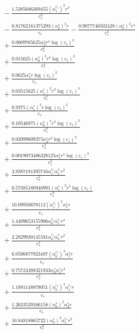 \documentclass[10pt]{article}
\begin{document}
\begin{align*}
&{}  - \frac{1.5385686369455 \left(\alpha_{1}^{c_s}\right)^{2} r^{3}}{c_{s}^{3}} \\
&{}  - \frac{0.81762161375293 \left(\alpha_{2}^s\right)^{2} r}{c_{s}} - \frac{0.9077746502428 \left(\alpha_{0}^s\right)^{3} r^{4}}{c_{s}^{4}} \\
&{}  + \frac{0.0009765625 \alpha_{2}^s r^{4} \log{\left(c_{s} \right)}^{3}}{c_{s}^{4}} \\
&{}  + \frac{0.015625 \left(\alpha_{0}^s\right)^{3} r^{4} \log{\left(c_{s} \right)}^{3}}{c_{s}^{4}} \\
&{}  + \frac{0.0625 \alpha_{5}^s r \log{\left(c_{s} \right)}^{2}}{c_{s}} \\
&{}  + \frac{0.03515625 \left(\alpha_{1}^s\right)^{2} r^{3} \log{\left(c_{s} \right)}^{3}}{c_{s}^{3}} \\
&{}  + \frac{0.9375 \left(\alpha_{1}^s\right)^{3} r \log{\left(c_{s} \right)}^{2}}{c_{s}} \\
&{}  + \frac{0.10546875 \left(\alpha_{0}^s\right)^{4} r^{3} \log{\left(c_{s} \right)}^{3}}{c_{s}^{3}} \\
&{}  + \frac{0.02099609375 \alpha_{3}^s r^{3} \log{\left(c_{s} \right)}^{2}}{c_{s}^{3}} \\
&{}  + \frac{0.0019073486328125 \alpha_{1}^s r^{5} \log{\left(c_{s} \right)}^{2}}{c_{s}^{5}} \\
&{}  + \frac{3.9387181395716 \alpha_{1}^{c_s} \alpha_{2}^{c_s} r^{2}}{c_{s}^{2}} \\
&{}  + \frac{0.57385180946901 \left(\alpha_{1}^s\right)^{2} r^{3} \log{\left(c_{s} \right)}}{c_{s}^{3}} \\
&{}  + \frac{10.09950678112 \left(\alpha_{1}^{c_s}\right)^{2} \alpha_{1}^s r}{c_{s}} \\
&{}  + \frac{1.4409653155906 \alpha_{0}^{c_s} \alpha_{1}^{c_s} r^{4}}{c_{s}^{4}} \\
&{}  + \frac{2.2829930145581 \alpha_{0}^{c_s} \alpha_{3}^{c_s} r^{2}}{c_{s}^{2}} \\
&{}  + \frac{6.0506877923487 \left(\alpha_{0}^{c_s}\right)^{4} \alpha_{1}^s r}{c_{s}} \\
&{}  + \frac{0.75724388321833 \alpha_{0}^s \alpha_{1}^s r^{4}}{c_{s}^{4}} \\
&{}  + \frac{1.1881148878051 \left(\alpha_{0}^{c_s}\right)^{4} \alpha_{1}^{c_s} r}{c_{s}} \\
&{}  + \frac{1.2633539166158 \left(\alpha_{0}^s\right)^{2} \alpha_{3}^s r}{c_{s}} \\
&{}  + \frac{10.84818865722 \left(\alpha_{0}^s\right)^{3} \alpha_{1}^{c_s} r^{2}}{c_{s}^{2}} \\

\end{align*}
\end{document}
